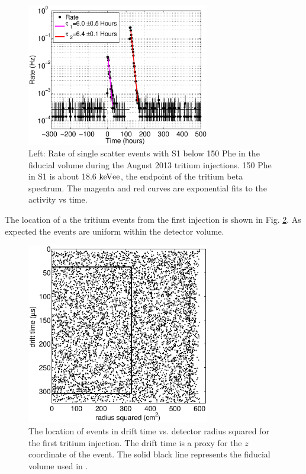 \begin{figure}[h!]\centering
\includegraphics[width=80mm]{CH3T_Rate_fid_150_Run03_Tritium_Rate.eps}
\caption{Left: Rate of single scatter events with S1 below 150 Phe in the fiducial volume during the August 2013 tritium injections. 150 Phe in S1 is about 18.6 $\rm keV{ee}$, the endpoint of the tritium beta spectrum. The magenta and red curves are exponential fits to the activity vs time.}
\label{fig:ch3t_removal}
\end{figure}

The location of a the tritium events from the first injection is shown in Fig. \ref{fig:event_location}. As expected the events are uniform within the detector volume.
 
\begin{figure}[h!]\centering
\includegraphics[width=80mm]{CH3T_RZ_scatter_lux10_20130812T1546.eps}
\caption{The location of events in drift time vs. detector radius squared for the first tritium injection. The drift time is a proxy for the $z$ coordinate of the event. The solid black line represents the fiducial volume used in \cite{luxresults}.}
\label{fig:event_location}
\end{figure}






